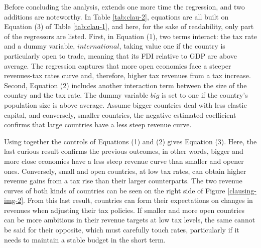 Before concluding the analysis, \textcite{clausing} extends one more time the regression, and two additions are noteworthy. In Table \ref{tab:clau-2}, equations are all built on Equation (3) of Table \ref{tab:clau-1}, and here, for the sake of readability, only part of the regressors are listed. First, in Equation (1), two terms interact: the tax rate and a dummy variable, $international$, taking value one if the country is particularly open to trade, meaning that its FDI relative to GDP are above average. The regression captures that more open economies face a steeper revenues-tax rates curve and, therefore, higher tax revenues from a tax increase. Second, Equation (2) includes another interaction term between the size of the country and the tax rate. The dummy variable $big$ is set to one if the country's population size is above average. Assume bigger countries deal with less elastic capital, and conversely, smaller countries, the negative estimated coefficient confirms that large countries have a less steep revenue curve.

Using together the controls of Equations (1) and (2) gives Equation (3). Here, the last curious result confirms the previous outcomes, in other words, bigger and more close economies have a less steep revenue curve than smaller and opener ones. Conversely, small and open countries, at low tax rates, can obtain higher revenue gains from a tax rise than their larger counterparts. The two revenue curves of both kinds of countries can be seen on the right side of Figure \ref{clausing-img-2}. From this last result, countries can form their expectations on changes in revenues when adjusting their tax policies. If smaller and more open countries can be more ambitious in their revenue targets at low tax levels, the same cannot be said for their opposite, which must carefully touch rates, particularly if it needs to maintain a stable budget in the short term.